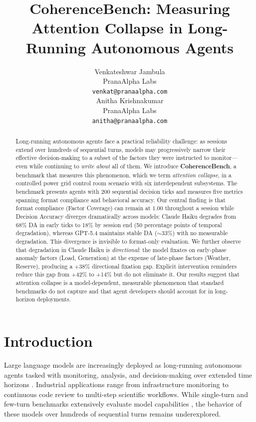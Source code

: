 \documentclass{article}
\title{CoherenceBench: Measuring Attention Collapse in Long-Running Autonomous Agents}
\author{%
  Venkateshwar Jambula \\
  PranaAlpha Labs \\
  \texttt{venkat@pranaalpha.com} \\
  \And
  Anitha Krishnakumar \\
  PranaAlpha Labs \\
  \texttt{anitha@pranaalpha.com} \\
}
\begin{document}
\maketitle

\begin{abstract}
Long-running autonomous agents face a practical reliability challenge:
as sessions extend over hundreds of sequential turns, models may
progressively narrow their effective decision-making to a subset of the
factors they were instructed to monitor---even while continuing to
\emph{write about} all of them. We introduce \textbf{CoherenceBench}, a
benchmark that measures this phenomenon, which we term \emph{attention
collapse}, in a controlled power grid control room scenario with six
interdependent subsystems. The benchmark presents agents with 200
sequential decision ticks and measures five metrics spanning format
compliance and behavioral accuracy. Our central finding is that format
compliance (Factor Coverage) can remain at 1.00 throughout a session
while Decision Accuracy diverges dramatically across models: Claude
Haiku degrades from 68\% DA in early ticks to 18\% by session end (50
percentage points of temporal degradation), whereas GPT-5.4 maintains
stable DA ($\sim$33\%) with no measurable degradation. This divergence
is invisible to format-only evaluation. We further observe that
degradation in Claude Haiku is \emph{directional}: the model fixates on
early-phase anomaly factors (Load, Generation) at the expense of
late-phase factors (Weather, Reserve), producing a +38\% directional
fixation gap. Explicit intervention reminders reduce this gap from +42\%
to +14\% but do not eliminate it. Our results suggest that attention
collapse is a model-dependent, measurable phenomenon that standard
benchmarks do not capture and that agent developers should account for in
long-horizon deployments.
\end{abstract}

\section{Introduction}
\label{sec:intro}

Large language models are increasingly deployed as long-running
autonomous agents tasked with monitoring, analysis, and decision-making
over extended time horizons \cite{park2023generative,
significant2023auto}. Industrial applications range from infrastructure
monitoring to continuous code review to multi-step scientific workflows.
While single-turn and few-turn benchmarks extensively evaluate model
capabilities \cite{jimenez2024swebench, zhou2024webarena}, the behavior
of these models over hundreds of sequential turns remains underexplored.
\end{document}
